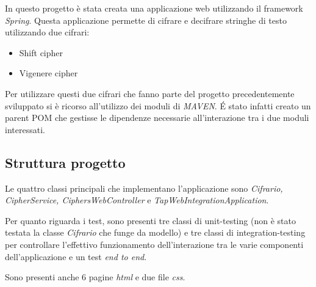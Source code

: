 \documentclass[12pt]{article}
\newcommand{\sectionline}{
	\begin{center}
		\resizebox{0.5\linewidth}{1ex}{
			\begin{tikzpicture}
			\node  (C) at (0,0) {};
			\node (D) at (9,0) {};
			\path (C) to [ornament=83] (D);
			\end{tikzpicture}
		}
	\end{center}
}
\begin{document}
	In questo progetto è stata creata una applicazione web utilizzando il framework \emph{Spring}. Questa applicazione permette di cifrare e decifrare stringhe di testo utilizzando due cifrari:
	
	\begin{itemize}
		\item Shift cipher
		\item Vigenere cipher
	\end{itemize}
	
	Per utilizzare questi due cifrari che fanno parte del progetto precedentemente sviluppato si è ricorso all'utilizzo dei moduli di \emph{MAVEN}. \'{E} stato infatti creato un parent POM che gestisse le dipendenze necessarie all'interazione tra i due moduli interessati.
	
	\subsection{Struttura progetto}
		Le quattro classi principali che implementano l'applicazione sono \emph{Cifrario, CipherService, CiphersWebController} e \emph{TapWebIntegrationApplication}.
		
		Per quanto riguarda i test, sono presenti tre classi di unit-testing (non è stato testata la classe \emph{Cifrario} che funge da modello) e tre classi di integration-testing per controllare l'effettivo funzionamento dell'interazione tra le varie componenti dell'applicazione e un test \emph{end to end}.
		
		Sono presenti anche 6 pagine \emph{html} e due file \emph{css}.
	
	\sectionline
	
\end{document}
